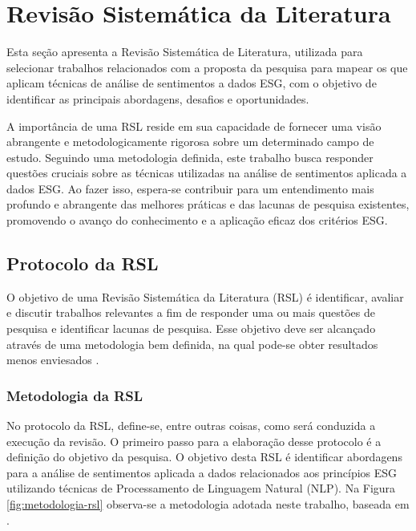 \chapter{Revisão Sistemática da Literatura}
\label{cap:rsl}

Esta seção apresenta a Revisão Sistemática de Literatura, utilizada para selecionar trabalhos
relacionados com a proposta da pesquisa para mapear os que aplicam técnicas de análise de
sentimentos a dados ESG, com o objetivo de identificar as principais abordagens, desafios e
oportunidades.

A importância de uma \gls{RSL} reside em sua capacidade de fornecer uma visão abrangente e
metodologicamente rigorosa sobre um determinado campo de estudo. Seguindo uma metodologia
definida, este trabalho busca responder questões cruciais sobre as técnicas utilizadas na análise de
sentimentos aplicada a dados ESG. Ao fazer isso, espera-se contribuir para um entendimento mais
profundo e abrangente das melhores práticas e das lacunas de pesquisa existentes, promovendo o
avanço do conhecimento e a aplicação eficaz dos critérios ESG.

\section{Protocolo da RSL}
\label{sec:protocolo-rsl}

O objetivo de uma Revisão Sistemática da Literatura (RSL) é identificar, avaliar e discutir
trabalhos relevantes a fim de responder uma ou mais questões de pesquisa e identificar lacunas de
pesquisa. Esse objetivo deve ser alcançado através de uma metodologia bem definida, na qual
pode-se obter resultados menos enviesados \cite{dresch2015}.

\subsection{Metodologia da RSL}
\label{subsec:metodologia-rsl}

No protocolo da RSL, define-se, entre outras coisas, como será conduzida a execução da
revisão. O primeiro passo para a elaboração desse protocolo é a definição do objetivo da pesquisa.
O objetivo desta RSL é identificar abordagens para a análise de sentimentos aplicada a dados
relacionados aos princípios ESG utilizando técnicas de Processamento de Linguagem Natural (NLP).
Na Figura \ref{fig:metodologia-rsl} observa-se a metodologia adotada neste trabalho, baseada em
\citeauthor{dresch2015} \citeyear{dresch2015}.

